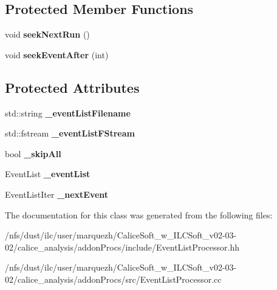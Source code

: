 \subsection*{Protected Member Functions}
\begin{DoxyCompactItemize}
\item 
void {\bfseries seek\-Next\-Run} ()\label{classCALICE_1_1EventListProcessor_ae343cf6f6cefa042a8cc0dedb6e10270}

\item 
void {\bfseries seek\-Event\-After} (int)\label{classCALICE_1_1EventListProcessor_a76b0e99806b8c34790e5d8a1da36b279}

\end{DoxyCompactItemize}
\subsection*{Protected Attributes}
\begin{DoxyCompactItemize}
\item 
std\-::string {\bfseries \-\_\-event\-List\-Filename}\label{classCALICE_1_1EventListProcessor_ab8779b7ff00ca329ec3195ede9558ce3}

\item 
std\-::fstream {\bfseries \-\_\-event\-List\-F\-Stream}\label{classCALICE_1_1EventListProcessor_a9e5afcb38c4a88ad22214ba552e97671}

\item 
bool {\bfseries \-\_\-skip\-All}\label{classCALICE_1_1EventListProcessor_a8f2c9676aeded88f48b3a203c19069a8}

\item 
Event\-List {\bfseries \-\_\-event\-List}\label{classCALICE_1_1EventListProcessor_a2b73e686f4ea3b6575dd77448017d89c}

\item 
Event\-List\-Iter {\bfseries \-\_\-next\-Event}\label{classCALICE_1_1EventListProcessor_a42a9da251da35720e119cc0c7d48c043}

\end{DoxyCompactItemize}


The documentation for this class was generated from the following files\-:\begin{DoxyCompactItemize}
\item 
/nfs/dust/ilc/user/marquezh/\-Calice\-Soft\-\_\-w\-\_\-\-I\-L\-C\-Soft\-\_\-v02-\/03-\/02/calice\-\_\-analysis/addon\-Procs/include/Event\-List\-Processor.\-hh\item 
/nfs/dust/ilc/user/marquezh/\-Calice\-Soft\-\_\-w\-\_\-\-I\-L\-C\-Soft\-\_\-v02-\/03-\/02/calice\-\_\-analysis/addon\-Procs/src/Event\-List\-Processor.\-cc\end{DoxyCompactItemize}
